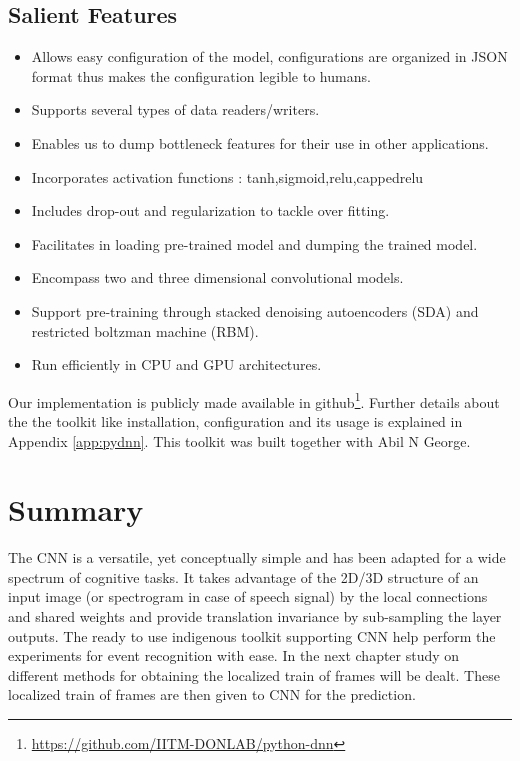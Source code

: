 \subsection{Salient Features}
\begin{itemize}
	\item Allows easy configuration of the model, configurations are organized in JSON format thus makes the configuration legible to humans.
	\item Supports several types of data readers/writers. 
	\item Enables us to dump bottleneck features for their use in other applications.
	\item Incorporates activation functions : tanh,sigmoid,relu,cappedrelu
	\item Includes drop-out and regularization to tackle over fitting.
	\item Facilitates in loading pre-trained model and dumping the trained model.
	\item Encompass two and three dimensional convolutional models.
	\item Support pre-training through stacked denoising autoencoders (SDA) and restricted boltzman machine (RBM).
	\item Run efficiently in CPU and GPU architectures.	
\end{itemize}
Our implementation is publicly made available in github\footnote{\url{https://github.com/IITM-DONLAB/python-dnn}}.  Further details about the the toolkit like installation, configuration and its usage is explained in Appendix \ref{app:pydnn}. This toolkit was built together with Abil N George.
\clearpage

\section{Summary}
The CNN is a versatile, yet conceptually simple and has been adapted for a wide spectrum of cognitive tasks.  It takes advantage of the 2D/3D structure of an input image (or spectrogram in case of speech signal) by the local connections and shared weights and provide translation invariance by sub-sampling the layer outputs.  The ready to use indigenous toolkit supporting CNN help perform the experiments for event recognition with ease.  In the next chapter study on different methods for obtaining the localized train of frames will be dealt.  These localized train of frames are then given to CNN for the prediction.